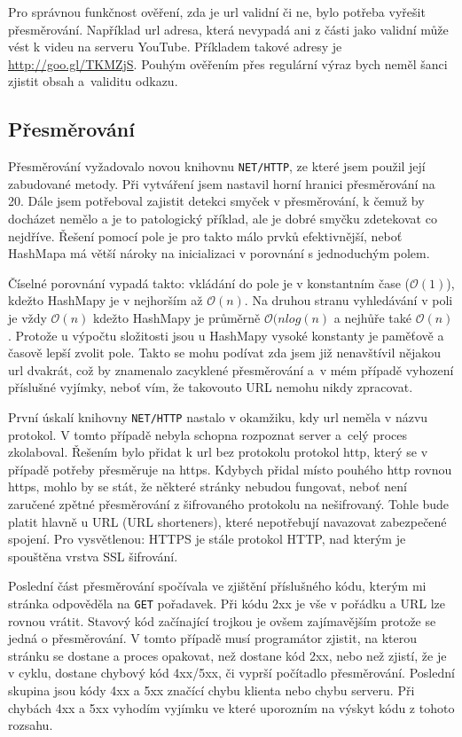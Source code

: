 \par Pro správnou funkčnost ověření, zda je url validní či ne, bylo potřeba vyřešit přesměrování. Například url adresa, která nevypadá ani z části jako validní může vést k videu na serveru YouTube. Příkladem takové adresy je \url{http://goo.gl/TKMZjS}. Pouhým ověřením přes regulární výraz bych neměl šanci zjistit obsah a~validitu odkazu. 

\subsection{Přesměrování}
\par Přesměrování\cite{nethttp} vyžadovalo novou knihovnu \texttt{NET/HTTP}, ze které jsem použil její zabudované metody. Při vytváření jsem nastavil horní hranici přesměrování na 20. Dále jsem potřeboval zajistit detekci smyček v přesměrování, k čemuž by docházet nemělo a je to patologický příklad, ale je dobré smyčku zdetekovat co nejdříve. Řešení pomocí pole je pro takto málo prvků efektivnější, neboť HashMapa má větší nároky na inicializaci v porovnání s jednoduchým polem. 
\par Číselné porovnání vypadá takto: vkládání do pole je v konstantním čase ($\mathcal{O}(1)$), kdežto HashMapy je v nejhorším až $\mathcal{O}(n)$. Na druhou stranu vyhledávání v poli je vždy $\mathcal{O}(n)$ kdežto HashMapy je průměrně $\mathcal{O}(nlog(n)$ a nejhůře také $\mathcal{O}(n)$. Protože u výpočtu složitosti jsou u HashMapy vysoké konstanty je paměťově a časově lepší zvolit pole. Takto se mohu podívat zda jsem již nenavštívil nějakou url dvakrát, což by znamenalo zacyklené přesměrování a~v mém případě vyhození příslušné vyjímky, neboť vím, že takovouto URL nemohu nikdy zpracovat.

\par První úskalí knihovny \texttt{NET/HTTP}\cite{nethttp} nastalo v okamžiku, kdy url neměla v názvu protokol. V tomto případě nebyla schopna rozpoznat server a~celý proces zkolaboval. Řešením bylo přidat k url bez protokolu protokol http, který se v případě potřeby přesměruje na https. Kdybych přidal místo pouhého http rovnou https, mohlo by se stát, že některé stránky nebudou fungovat, neboť není zaručené zpětné přesměrování z šifrovaného protokolu na nešifrovaný. Tohle bude platit hlavně u  URL (URL shorteners), které nepotřebují navazovat zabezpečené spojení. Pro vysvětlenou: HTTPS je stále protokol HTTP, nad kterým je spouštěna vrstva SSL šifrování.
\par Poslední část přesměrování spočívala ve zjištění příslušného kódu, kterým mi stránka odpověděla na \texttt{GET} pořadavek. Při kódu 2xx je vše v pořádku a URL lze rovnou vrátit. Stavový kód začínající trojkou je ovšem zajímavějším protože se jedná o přesměrování. V tomto případě musí programátor zjistit, na kterou stránku se dostane a proces opakovat, než dostane kód 2xx, nebo než zjistí, že je v cyklu, dostane chybový kód 4xx/5xx, či vyprší počítadlo přesměrování. Poslední skupina jsou kódy 4xx a 5xx značící chybu klienta nebo chybu serveru. Při chybách 4xx a 5xx vyhodím vyjímku ve které uporozním na výskyt kódu z tohoto rozsahu.



